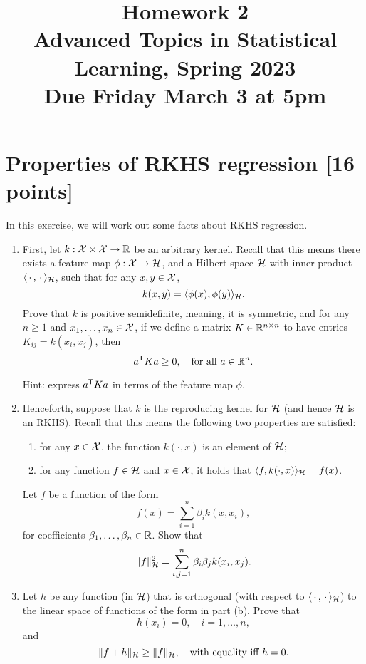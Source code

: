 \documentclass{article}
\title{Homework 2 \\ \smallskip
\large Advanced Topics in Statistical Learning, Spring 2023 \\ \smallskip
Due Friday March 3 at 5pm}
\date{}
\begin{document}
\maketitle
\RaggedRight
\vspace{-50pt}

\section{Properties of RKHS regression [16 points]}

In this exercise, we will work out some facts about RKHS regression. 

\begin{enumerate}[label=(\alph*)]
\item First, let $k : \mathcal{X} \times \mathcal{X} \to \mathbb{R}$ be an arbitrary kernel. Recall that
  this means there exists a feature map $\phi : \mathcal{X} \to \mathcal{H}$, and a Hilbert
  space $\mathcal{H}$ with inner product $\langle \,\cdot\,, \,\cdot\, \rangle_{\mathcal{H}}$,
  such that for any $x,y \in \mathcal{X}$,    
  \[
  k(x,y) = \langle \phi(x), \phi(y) \rangle_{\mathcal{H}}.
  \]
  Prove that $k$ is positive semidefinite, meaning, it is symmetric, and for any 
  $n \geq 1$ and $x_1,\dots,x_n \in \mathcal{X}$, if we define a matrix $K \in \mathbb{R}^{n
    \times n}$ to have entries $K_{ij} = k(x_i, x_j)$, then  
  \marginpar{\small [3 pts]}
  \[
  a^{\mathsf{T}} K a \geq 0, \quad \text{for all $a \in \mathbb{R}^n$}.
  \]

  Hint: express $a^{\mathsf{T}} K a$ in terms of the feature map $\phi$.

\item Henceforth, suppose that $k$ is the reproducing kernel for $\mathcal{H}$ (and
  hence $\mathcal{H}$ is an RKHS). Recall that this means the following two properties
  are satisfied: 
  \begin{enumerate}
  \item for any $x \in \mathcal{X}$, the function $k(\cdot, x)$ is an element of $\mathcal{H}$;   
  \item for any function $f \in \mathcal{H}$ and $x \in \mathcal{X}$, it holds that $\langle f,
    k(\cdot, x) \rangle_{\mathcal{H}} = f(x)$. 
  \end{enumerate}
  Let $f$ be a function of the form 
  \[  
  f(x) = \sum_{i=1}^n \beta_i k(x, x_i),
  \]
  for coefficients $\beta_1,\dots,\beta_n \in \mathbb{R}$. Show that 
  \marginpar{\small [2 pts]}
  \[
  \|f\|_{\mathcal{H}}^2 = \sum_{i,j=1}^n \beta_i \beta_j k(x_i,x_j).
  \]

\item Let $h$ be any function (in $\mathcal{H}$) that is orthogonal (with respect to
  $\langle \,\cdot\,, \,\cdot\, \rangle_{\mathcal{H}}$) to the linear space of functions
  of the form in part (b). Prove that 
  \marginpar{\small [3 pts]}
  \[
  h(x_i) = 0, \quad i=1,\dots,n,
  \]
  and
  \[
  \|f + h\|_{\mathcal{H}} \geq \|f\|_{\mathcal{H}}, \quad \text{with equality iff $h=0$}. 
  \]


\end{enumerate}
\end{document}
